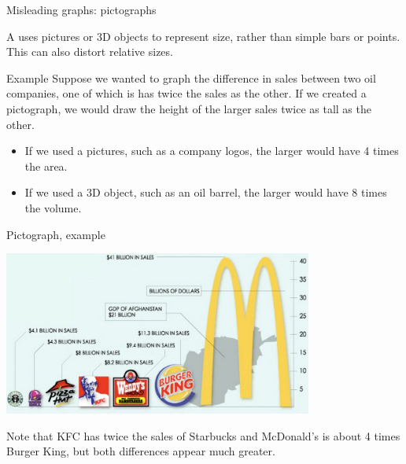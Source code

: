 \documentclass[xcolor=table, aspectratio=169, bigger, handout]{beamer}
\begin{document}
\begin{frame}{Misleading graphs: pictographs}
\begin{block}{}
A  uses pictures or 3D objects to represent size, rather than simple bars or points. This can also distort relative sizes.
\end{block}

\pause
\begin{exampleblock}{Example}
Suppose we wanted to graph the difference in sales between two oil companies, one of which is has twice the sales as the other. If we created a pictograph, we would draw the height of the larger sales twice as tall as the other.
\begin{itemize}
\item If we used a pictures, such as a company logos, the larger would have 4 times the area.
\item If we used a 3D object, such as an oil barrel, the larger would have 8 times the volume. 
\end{itemize}
\end{exampleblock}
\end{frame}

\begin{frame}{Pictograph, example}
\begin{center}
\includegraphics[width=4in]{../images/wk04_fastfood_pictograph}
\end{center}
\begin{block}{}
Note that KFC has twice the sales of Starbucks and McDonald's is about 4 times Burger King, but both differences appear much greater.
\end{block}
\end{frame}
\end{document}
